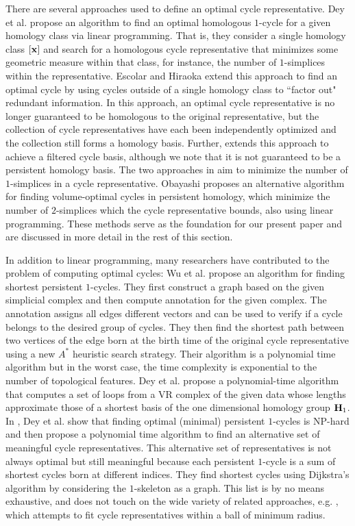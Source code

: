  
There are several approaches used to define an optimal cycle representative. Dey et al. \cite{dey2011optimal} propose an algorithm to find an optimal homologous $1$-cycle for a given homology class via linear programming. That is, they consider a single homology class $[\mathbf{x}]$ and search for a homologous cycle representative that minimizes some geometric measure within that class, for instance, the number of $1$-simplices within the representative. Escolar and Hiraoka \cite{Escolar2016} extend this approach to find an optimal cycle by using cycles outside of a single homology class to ``factor out" redundant information. In this approach, an optimal cycle representative is no longer guaranteed to be homologous to the original representative, but the collection of cycle representatives have each been independently optimized and the collection still forms a homology basis. Further, \cite{Escolar2016} extends this approach to achieve a filtered cycle basis, although we note that it is not guaranteed to be a persistent homology basis. The two approaches in \cite{dey2011optimal,Escolar2016} aim to minimize the number of $1$-simplices in a cycle representative. Obayashi \cite{Obayashi2018} proposes an alternative algorithm for finding volume-optimal cycles in persistent homology, which minimize the number of $2$-simplices which the cycle representative bounds, also using linear programming. These methods serve as the foundation for our present paper and are discussed in more detail in the rest of this section.  


In addition to linear programming, many researchers have contributed to the problem of computing optimal cycles: Wu et al. \cite{wu} propose an algorithm for finding shortest persistent $1$-cycles. They first construct a graph based on the given simplicial complex and then compute annotation for the given complex. The annotation assigns all edges different vectors and can be used to verify if a cycle belongs to the desired group of cycles. They then find the shortest path between two vertices of the edge born at the birth time of the original cycle representative using a new $A^*$ heuristic search strategy. Their algorithm is a polynomial time algorithm but in the worst case, the time complexity is exponential to the number of topological features. Dey et al. \cite{shortestonedimension} propose a polynomial-time algorithm that computes a set of loops from a VR complex of the given data whose lengths approximate those of a shortest basis of the one dimensional homology group $\mathbf{H}_1$. In \cite{dey2018}, Dey et al. show that finding optimal (minimal) persistent $1$-cycles is NP-hard and then propose a polynomial time algorithm to find an alternative set of meaningful cycle representatives. This alternative set of representatives is not always optimal but still meaningful because each persistent $1$-cycle is a sum of shortest cycles born at different indices. They find shortest cycles using Dijkstra's algorithm by considering the $1$-skeleton as a graph.   This list is by no means exhaustive, and does not touch on the wide variety of related approaches, e.g. \cite{chenhardness}, which attempts to fit cycle representatives within a ball of minimum radius.



